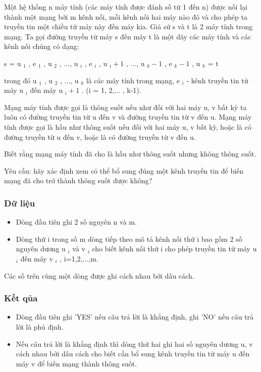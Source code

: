 



   Một hệ thống n máy tính (các máy tính được đánh số từ 1 đến n) được nối lại thành một mạng bởi m kênh nối, mỗi kênh nối hai máy nào đó và cho phép ta truyền tin một chiều từ máy này đến máy kia. Giả sử s và t là 2 máy tính trong mạng. Ta gọi đường truyền từ máy s đến máy t là một dãy các máy tính và các kênh nối chúng có dạng:  

   s = u   $_    1   $   , e   $_    1   $   , u   $_    2   $   , ..., u   $_    i   $   , e   $_    i   $   , u   $_    i+1   $   , ..., u   $_    k-1   $   , e   $_    k-1   $   , u   $_    k   $   = t  

   trong đó u   $_    1   $   , u   $_    2   $   , ..., u   $_    k   $   là các máy tính trong mạng, e   $_    i   $   - kênh truyền tin từ máy u   $_    i   $   đến máy u   $_    i+1   $   . (i = 1, 2,... , k-1).  

   Mạng máy tính được gọi là thông suốt nếu như đối với hai máy u, v bất kỳ ta luôn có đường truyền tin từ u đến v và đường truyền tin từ v đến u. Mạng máy tính được gọi là hầu như thông suốt nếu đối với hai máy u, v bất kỳ, hoặc là có đường truyền từ u đến v, hoặc là có đường truyền từ v đến u.  

   Biết rằng mạng máy tính đã cho là hầu như thông suốt nhưng không thông suốt.  

   Yêu cầu: hãy xác định xem có thể bổ sung đúng một kênh truyền tin để biến mạng đã cho trở thành thông suốt được không?  

\subsubsection{   Dữ liệu  }
\begin{itemize}
	\item     Dòng đầu tiên ghi 2 số nguyên n và m.   
	\item     Dòng thứ i trong số m dòng tiếp theo mô tả kênh nối thứ i bao gồm 2 số nguyên dương u    $_     i    $    và v    $_     i    $    cho biết kênh nối thứ i cho phép truyền tin từ máy u    $_     i    $    đến máy v    $_     i    $    , i=1,2,...,m.   
\end{itemize}

   Các số trên cùng một dòng được ghi cách nhau bởi dấu cách.  

\subsubsection{   Kết qủa  }
\begin{itemize}
	\item     Dòng đầu tiên ghi 'YES' nếu câu trả lời là khẳng định, ghi 'NO' nếu câu trả lời là phủ định.   
	\item     Nếu câu trả lời là khẳng định thì dòng thứ hai ghi hai số nguyên dương u, v cách nhau bởi dấu cách cho biết cần bổ sung kênh truyền tin từ máy u đến máy v để biến mạng thành thông suốt.   
\end{itemize}

